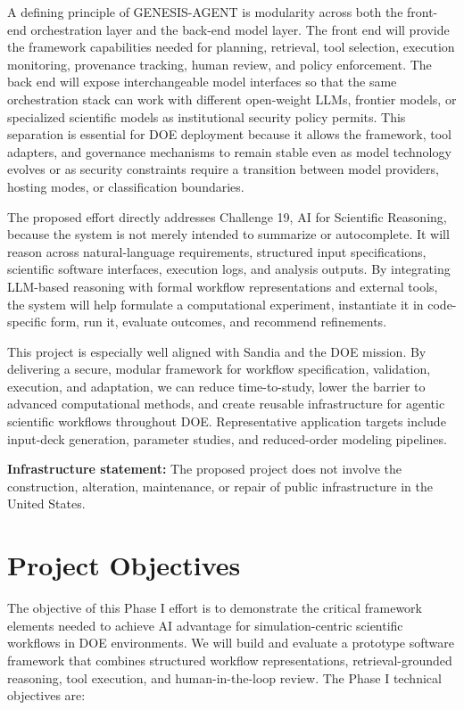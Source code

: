 \documentclass[11pt]{article} \usepackage[margin=1in]{geometry}
\begin{document}
A defining principle of GENESIS-AGENT is modularity across both the front-end
orchestration layer and the back-end model layer. The front end will provide the
framework capabilities needed for planning, retrieval, tool selection, execution
monitoring, provenance tracking, human review, and policy enforcement. The back
end will expose interchangeable model interfaces so that the same orchestration
stack can work with different open-weight LLMs, frontier models, or specialized
scientific models as institutional security policy permits. This separation is
essential for DOE deployment because it allows the framework, tool adapters, and
governance mechanisms to remain stable even as model technology evolves or as
security constraints require a transition between model providers, hosting
modes, or classification boundaries.

The proposed effort directly addresses Challenge 19, AI for Scientific
Reasoning, because the system is not merely intended to summarize or
autocomplete. It will reason across natural-language requirements, structured
input specifications, scientific software interfaces, execution logs, and
analysis outputs. By integrating LLM-based reasoning with formal workflow
representations and external tools, the system will help formulate a
computational experiment, instantiate it in code-specific form, run it, evaluate
outcomes, and recommend refinements.

This project is especially well aligned with Sandia and the DOE mission. By
delivering a secure, modular framework for workflow specification, validation,
execution, and adaptation, we can reduce time-to-study, lower the barrier to
advanced computational methods, and create reusable infrastructure for agentic
scientific workflows throughout DOE. Representative application targets include
input-deck generation, parameter studies, and reduced-order modeling pipelines.

\textbf{Infrastructure statement:} The proposed project does not involve the
construction, alteration, maintenance, or repair of public infrastructure in the
United States.

\section{Project Objectives} The objective of this Phase I effort is to
demonstrate the critical framework elements needed to achieve AI advantage for
simulation-centric scientific workflows in DOE environments. We will build and
evaluate a prototype software framework that combines structured workflow
representations, retrieval-grounded reasoning, tool execution, and
human-in-the-loop review. The Phase I technical objectives are:
\end{document}
